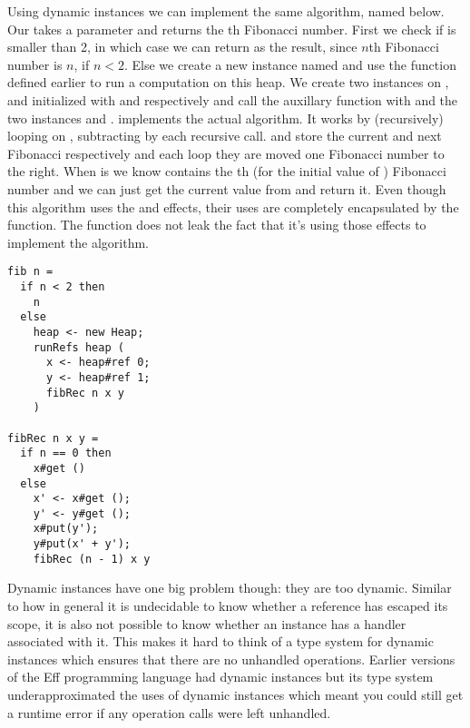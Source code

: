 Using dynamic instances we can implement the same algorithm, named  below.
Our  takes a parameter  and returns the th Fibonacci number.
First we check if  is smaller than 2, in which case we can return  as the result, since $n$th Fibonacci number is $n$, if $n < 2$.
Else we create a new  instance named  and use the  function defined earlier to run a computation on this heap.
We create two  instances on ,  and  initialized with  and  respectively and call the auxillary function  with  and the two instances  and .
 implements the actual algorithm.
It works by (recursively) looping on , subtracting by  each recursive call.
 and  store the current and next Fibonacci respectively and each loop they are moved one Fibonacci number to the right.
When  is  we know  contains the th (for the initial value of ) Fibonacci number and we can just get the current value from  and return it.
Even though this algorithm uses the  and  effects, their uses are completely encapsulated by the  function.
The  function does not leak the fact that it's using those effects to implement the algorithm.

\begin{verbatim}
fib n =
  if n < 2 then
    n
  else
    heap <- new Heap;
    runRefs heap (
      x <- heap#ref 0;
      y <- heap#ref 1;
      fibRec n x y
    )

fibRec n x y =
  if n == 0 then
    x#get ()
  else
    x' <- x#get ();
    y' <- y#get ();
    x#put(y');
    y#put(x' + y');
    fibRec (n - 1) x y
\end{verbatim}

Dynamic instances have one big problem though: they are too dynamic. Similar to how in general it is undecidable to know whether a reference has escaped its scope, it is also not possible to know whether an instance has a handler associated with it. This makes it hard to think of a type system for dynamic instances which ensures that there are no unhandled operations. Earlier versions of the Eff programming language\cite{eff1} had dynamic instances but its type system underapproximated the uses of dynamic instances which meant you could still get a runtime error if any operation calls were left unhandled.
